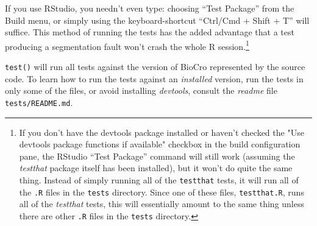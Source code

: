 \documentclass{article}\usepackage[]{graphicx}\usepackage[]{color}
\newcommand{\code}[1]{\lstinline[style=C++style]{#1}}
\newcommand{\Rcode}[1]{\lstinline[style=Rstyle]{#1}}
\begin{document}
If you use RStudio, you needn't even type: choosing ``Test Package''
from the Build menu, or simply using the keyboard-shortcut ``Ctrl/Cmd
+ Shift + T'' will suffice.  This method of running the tests has the
added advantage that a test producing a segmentation fault won't crash
the whole R session.\footnote{If you don't have the devtools package
installed or haven't checked the "Use devtools package functions if
available" checkbox in the build configuration pane, the RStudio
``Test Package'' command will still work (assuming the \emph{testthat}
package itself has been installed), but it won't do quite the same
thing.  Instead of simply running all of the \Rcode{testthat} tests,
it will run all of the \Rcode{.R} files in the \Rcode{tests}
directory.  Since one of these files, \code{testthat.R}, runs all of
the \emph{testthat} tests, this will essentially amount to the same
thing unless there are other \Rcode{.R} files in the \code{tests}
directory.}

\Rcode{test()} will run all tests against the version of BioCro
represented by the source code.  To learn how to run the tests against
an \emph{installed} version, run the tests in only some of the files,
or avoid installing \emph{devtools}, consult the \emph{readme} file
\code{tests/README.md}.


\pagebreak
\end{document}
